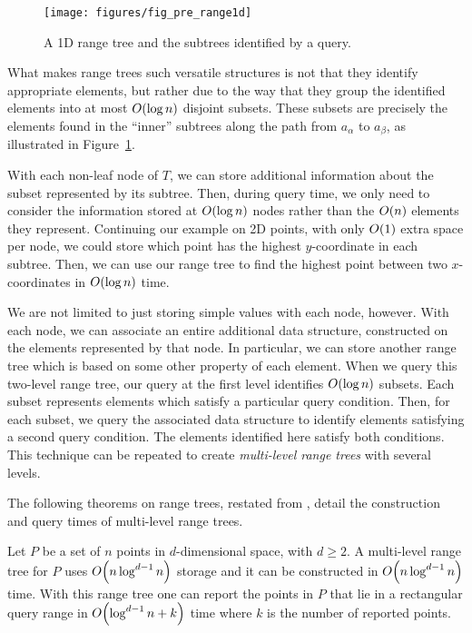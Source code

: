 \begin{figure}
\begin{center}
  \texttt{[image: figures/fig\_pre\_range1d]}
  \caption{A 1D range tree and the subtrees identified by a query.}
  \label{fig:pre:range1d}
\end{center}
\end{figure}

What makes range trees such versatile structures is not that they identify appropriate elements, but rather due to the way that they group the identified elements into at most $O\!\left(\log{n}\right)$ disjoint subsets.
These subsets are precisely the elements found in the ``inner'' subtrees along the path from $a_\alpha$ to $a_\beta$, as illustrated in Figure~\ref{fig:pre:range1d}.

With each non-leaf node of $T$, we can store additional information about the subset represented by its subtree.  Then, during query time, we only need to consider the information stored at $O\!\left(\log{n}\right)$ nodes rather than the $O\!\left(n\right)$ elements they represent. Continuing our example on 2D points, with only $O\!\left(1\right)$ extra space per node, we could store which point has the highest $y$-coordinate in each subtree.  Then, we can use our range tree to find the highest point between two $x$-coordinates in $O\!\left(\log{n}\right)$ time.

We are not limited to just storing simple values with each node, however.
With each node, we can associate an entire additional data structure, constructed on the elements represented by that node.
In particular, we can store another range tree which is based on some other property of each element.
When we query this two-level range tree, our query at the first level identifies $O\!\left(\log{n}\right)$ subsets.
Each subset represents elements which satisfy a particular query condition.
Then, for each subset, we query the associated data structure to identify elements satisfying a second query condition.
The elements identified here satisfy both conditions.
This technique can be repeated to create \emph{multi-level range trees} with several levels.

The following theorems on range trees, restated from \cite[Chapter~5]{Deberg}, detail the construction and query times of multi-level range trees.

\begin{theorem}
\label{th:rangetree}
Let $P$ be a set of $n$ points in $d$-dimensional space, with $d \geq 2$. A multi-level range tree for $P$ uses $O\!\left(n \log^{d-1}{n}\right)$ storage and it can be constructed in $O\!\left(n \log^{d-1}{n}\right)$ time. With this range tree one can report the points in $P$ that lie in a rectangular query range in $O\!\left(\log^{d-1}{n} + k\right)$ time where $k$ is the number of reported points.
\end{theorem}

